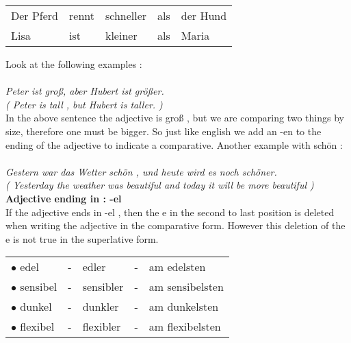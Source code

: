 \documentclass[a4paper,12pt]{article}
\begin{document}
\begin{adjustwidth}{2em}{0pt}
\begin{adjustwidth}{3em}{0pt}
\begin{tabular}{l l l l l}
  \cellcolor{white} Der Pferd 
& \cellcolor{white} rennt 
& \cellcolor{white} schneller 
& \cellcolor{white} als
& \cellcolor{white} der Hund
\\


  \cellcolor{white} Lisa
& \cellcolor{white} ist 
& \cellcolor{white} kleiner 
& \cellcolor{white} als
& \cellcolor{white} Maria 
\\

\end{tabular}
\vspace{0.3cm}
\newline


Look at the following examples :\\
\\
\textit{Peter ist groß, aber Hubert ist größer.\\
\color{gray}( Peter is tall , but Hubert is taller. ) \color{black}}\\

In the above sentence the adjective is groß , but we are comparing two things by
size, therefore one must be bigger. So just like english we add an -en to the
ending of the adjective to indicate a comparative. Another example with schön
:\\
\\
\textit{Gestern war das Wetter schön , und heute wird es noch schöner.\\
\color{gray} ( Yesterday the weather was beautiful and today it will be more
beautiful )  \color{black}}\\

\textbf{Adjective ending in : -el}\\
If the adjective ends in -el , then the e in the
second to last position is deleted when writing the adjective in the comparative
form. However this deletion of the e is not true in the superlative form.


\vspace{0.3cm}
\begin{tabular}{l l l l l}

\rowcolor{white} $\bullet$ edel     & - & edler     & - & am edelsten \\
\rowcolor{white} $\bullet$ sensibel & - & sensibler & - & am sensibelsten \\
\rowcolor{white} $\bullet$ dunkel   & - & dunkler   & - & am dunkelsten\\
\rowcolor{white} $\bullet$ flexibel & - & flexibler & - & am flexibelsten\\



\end{tabular}
\end{adjustwidth}
\end{adjustwidth}
\end{document}
